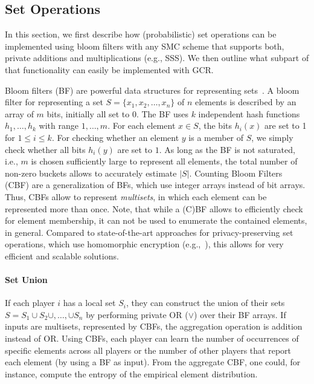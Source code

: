 \documentclass{sig-alternate}
\begin{document}
\subsection{Set Operations}\label{sec:setop}

In this section, we first describe how (probabilistic) set operations can be implemented using bloom filters with any SMC scheme that supports both, private additions and multiplications (e.g., SSS). 
We then outline what subpart of that functionality can easily be implemented with GCR. 

Bloom filters (BF) are powerful data structures for representing sets~\cite{broder2004network}. 
A bloom filter for representing a set $S = \{x_1, x_2, \ldots, x_n\}$ of $n$ elements is described by an array
of $m$ bits, initially all set to $0$. The BF uses $k$ independent hash functions
$h_1, \ldots , h_k$ with range ${1, \ldots , m}$. For each element $x \in S$,
the bits $h_i(x)$ are set to 1 for $1\leq i \leq k$.
For checking whether an element $y$ is a member of $S$, we simply check whether all bits $h_i(y)$ are set to $1$.
As long as the BF is not saturated, i.e., $m$ is chosen sufficiently large to represent all elements, the total number of non-zero buckets allows to 
accurately estimate $|S|$.
Counting Bloom Filters (CBF) are a generalization of BFs, which use integer arrays instead of bit arrays. Thus, CBFs allow to represent \emph{multisets}, in which each element can be represented more than once.
Note, that while a (C)BF allows to efficiently check for element membership, it can not be used to enumerate the contained elements, in general.
Compared to state-of-the-art approaches for privacy-preserving set operations, which use homomorphic encryption (e.g.,~\cite{kissner2005pps}), this allows for very efficient and scalable solutions.

\paragraph{Set Union}
If each player $i$ has a local set $S_i$, they can construct the union of their sets $S=S_1 \cup S_2 \cup, \ldots, \cup S_n$ by performing private OR ($\vee$) over their BF arrays. 
If inputs are multisets, represented by CBFs, the aggregation operation is addition instead of OR.
Using CBFs, each player can learn  the number of occurrences of specific elements across all players or the number of other players that report each element (by using a BF as input). From the aggregate CBF, one could, for instance, compute the entropy of the empirical element distribution.
\end{document}
